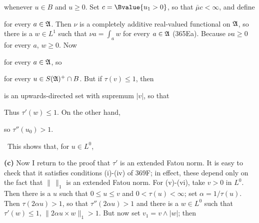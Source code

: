 {
     
\noindent whenever $u\in B$ and $u\ge 0$.   Set $c=\Bvalue{u_1>0}$, so
that $\bar\mu c<\infty$, and define
     
     
\noindent for every $a\in\frak A$.   Then $\nu$ is a completely additive
real-valued functional on $\frak A$, so there is a $w\in L^1$ such that
$\nu a=\int_aw$ for every $a\in\frak A$ (365Ea).  Because 
$\nu a\ge 0$ for every $a$, $w\ge 0$.   Now
     
     
\noindent for every $a\in\frak A$, so
     
     
\noindent for every $u\in S(\frak A)^+\cap B$.   But if $\tau(v)\le 1$,
then
     
     
\noindent is an upwards-directed set with supremum $|v|$, so that
     
     
\noindent Thus $\tau'(w)\le 1$.   On the other hand,
     
     
\noindent so $\tau''(u_0)>1$.
     
\medskip
     
\quad\grheadc\ This shows that, for $u\in L^0$,
     
     
\medskip
     
{\bf (c)} Now I return to the proof that $\tau'$ is an extended Fatou
norm.   It is easy to check that it satisfies conditions (i)-(iv) of
369F;  in effect, these depend only on the fact that $\|\,\|_1$ is an
extended Fatou norm.   For (v)-(vi), take $v>0$ in $L^0$.   Then there
is a $u$ such that $0\le u\le v$ and $0<\tau(u)<\infty$;   set
$\alpha=1/\tau(u)$.   Then $\tau(2\alpha u)>1$, so that 
$\tau''(2\alpha u)>1$ and there is a $w\in L^0$ such that 
$\tau'(w)\le 1$, $\|2\alpha u\times w\|_1>1$.   But now set $v_1=v\wedge|w|$;  then
     
     
}
